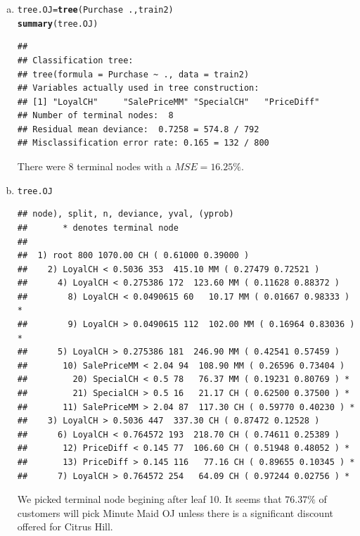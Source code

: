 \documentclass{article}\usepackage[]{graphicx}\usepackage[]{color}
\makeatletter
\newcommand{\hlopt}[1]{\textcolor[rgb]{0,0,0}{#1}}%
\newcommand{\hlstd}[1]{\textcolor[rgb]{0.345,0.345,0.345}{#1}}%
\newcommand{\hlkwb}[1]{\textcolor[rgb]{0.69,0.353,0.396}{#1}}%
\newcommand{\hlkwd}[1]{\textcolor[rgb]{0.737,0.353,0.396}{\textbf{#1}}}%
\newenvironment{kframe}{%
 \def\at@end@of@kframe{}%
 \ifinner\ifhmode%
  \def\at@end@of@kframe{\end{minipage}}%
  \begin{minipage}{\columnwidth}%
 \fi\fi%
 \def\FrameCommand##1{\hskip\@totalleftmargin \hskip-\fboxsep
 \colorbox{shadecolor}{##1}\hskip-\fboxsep
     \hskip-\linewidth \hskip-\@totalleftmargin \hskip\columnwidth}%
 \MakeFramed {\advance\hsize-\width
   \@totalleftmargin\z@ \linewidth\hsize
   \@setminipage}}%
 {\par\unskip\endMakeFramed%
 \at@end@of@kframe}
\newenvironment{knitrout}{}{} %
\makeatother
\begin{document}
\begin{enumerate}[(a)]
\item
\begin{knitrout}
\color{fgcolor}\begin{kframe}
\begin{alltt}
\hlstd{tree.OJ}\hlkwb{=}\hlkwd{tree}\hlstd{(Purchase}\hlopt{~}\hlstd{.,train2)}
\hlkwd{summary}\hlstd{(tree.OJ)}
\end{alltt}
\begin{verbatim}
## 
## Classification tree:
## tree(formula = Purchase ~ ., data = train2)
## Variables actually used in tree construction:
## [1] "LoyalCH"     "SalePriceMM" "SpecialCH"   "PriceDiff"  
## Number of terminal nodes:  8 
## Residual mean deviance:  0.7258 = 574.8 / 792 
## Misclassification error rate: 0.165 = 132 / 800
\end{verbatim}
\end{kframe}
\end{knitrout}
There were 8 terminal nodes with a $MSE = 16.25\%$.

\item
\begin{knitrout}
\color{fgcolor}\begin{kframe}
\begin{alltt}
\hlstd{tree.OJ}
\end{alltt}
\begin{verbatim}
## node), split, n, deviance, yval, (yprob)
##       * denotes terminal node
## 
##  1) root 800 1070.00 CH ( 0.61000 0.39000 )  
##    2) LoyalCH < 0.5036 353  415.10 MM ( 0.27479 0.72521 )  
##      4) LoyalCH < 0.275386 172  123.60 MM ( 0.11628 0.88372 )  
##        8) LoyalCH < 0.0490615 60   10.17 MM ( 0.01667 0.98333 ) *
##        9) LoyalCH > 0.0490615 112  102.00 MM ( 0.16964 0.83036 ) *
##      5) LoyalCH > 0.275386 181  246.90 MM ( 0.42541 0.57459 )  
##       10) SalePriceMM < 2.04 94  108.90 MM ( 0.26596 0.73404 )  
##         20) SpecialCH < 0.5 78   76.37 MM ( 0.19231 0.80769 ) *
##         21) SpecialCH > 0.5 16   21.17 CH ( 0.62500 0.37500 ) *
##       11) SalePriceMM > 2.04 87  117.30 CH ( 0.59770 0.40230 ) *
##    3) LoyalCH > 0.5036 447  337.30 CH ( 0.87472 0.12528 )  
##      6) LoyalCH < 0.764572 193  218.70 CH ( 0.74611 0.25389 )  
##       12) PriceDiff < 0.145 77  106.60 CH ( 0.51948 0.48052 ) *
##       13) PriceDiff > 0.145 116   77.16 CH ( 0.89655 0.10345 ) *
##      7) LoyalCH > 0.764572 254   64.09 CH ( 0.97244 0.02756 ) *
\end{verbatim}
\end{kframe}
\end{knitrout}
We picked terminal node begining after leaf 10. It seems that $76.37\%$ of customers will pick Minute Maid OJ unless there is a significant discount offered for Citrus Hill.


\end{enumerate}
\end{document}
